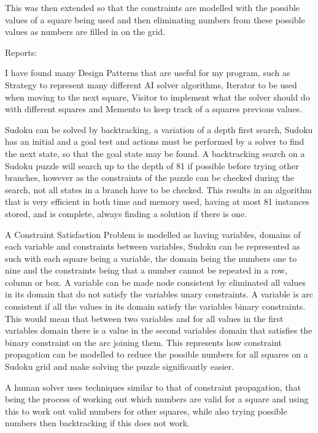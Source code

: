 \documentclass[]{final_report}
\begin{document}
{{		This was then extended so that the constraints are modelled with the possible values of a square being used and then eliminating numbers from these possible values as numbers are filled in on the grid.
		
		\newpage
		Reports:
		
		I have found many Design Patterns that are useful for my program, such as Strategy to represent many different AI solver algorithms, Iterator to be used when moving to the next square, Visitor to implement what the solver should do with different squares and Memento to keep track of a squares previous values.
		
		Sudoku can be solved by backtracking, a variation of a depth first search, Sudoku has an initial and a goal test and actions must be performed by a solver to find the next state, so that the goal state may be found. A backtracking search on a Sudoku puzzle will search up to the depth of 81 if possible before trying other branches, however as the constraints of the puzzle can be checked during the search, not all states in a branch have to be checked. This results in an algorithm that is very efficient in both time and memory used, having at most 81 instances stored, and is complete, always finding a solution if there is one.
		
		A Constraint Satisfaction Problem is modelled as having variables, domains of each variable and constraints between variables, Sudoku can be represented as such with each square being a variable, the domain being the numbers one to nine and the constraints being that a number cannot be repeated in a row, column or box. A variable can be made node consistent by eliminated all values in its domain that do not satisfy the variables unary constraints. A variable is arc consistent if all the values in its domain satisfy the variables binary constraints. This would mean that between two variables and for all values in the first variables domain there is a value in the second variables domain that satisfies the binary constraint on the arc joining them. This represents how constraint propagation can be modelled to reduce the possible numbers for all squares on a Sudoku grid and make solving the puzzle significantly easier.
		
		A human solver uses techniques similar to that of constraint propagation, that being the process of working out which numbers are valid for a square and using this to work out valid numbers for other squares, while also trying possible numbers then backtracking if this does not work.
		
}}
\end{document}
